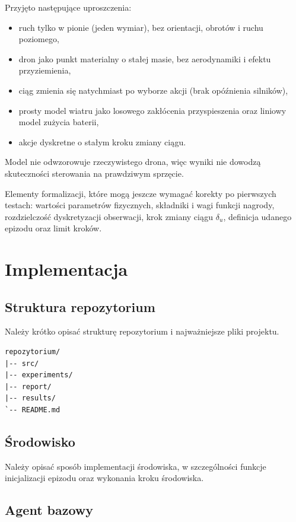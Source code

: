 \documentclass[12pt]{article}
\begin{document}
Przyjęto następujące uproszczenia:
\begin{itemize}
    \item ruch tylko w pionie (jeden wymiar), bez orientacji, obrotów i ruchu poziomego,
    \item dron jako punkt materialny o stałej masie, bez aerodynamiki i efektu przyziemienia,
    \item ciąg zmienia się natychmiast po wyborze akcji (brak opóźnienia silników),
    \item prosty model wiatru jako losowego zakłócenia przyspieszenia oraz liniowy model zużycia baterii,
    \item akcje dyskretne o stałym kroku zmiany ciągu.
\end{itemize}

Model nie odwzorowuje rzeczywistego drona, więc wyniki nie dowodzą skuteczności sterowania na prawdziwym sprzęcie.

Elementy formalizacji, które mogą jeszcze wymagać korekty po pierwszych testach: wartości parametrów fizycznych, składniki i wagi funkcji nagrody, rozdzielczość dyskretyzacji obserwacji, krok zmiany ciągu $\delta_u$, definicja udanego epizodu oraz limit kroków.

\section{Implementacja}

\subsection{Struktura repozytorium}

Należy krótko opisać strukturę repozytorium i najważniejsze pliki projektu.

\begin{verbatim}
repozytorium/
|-- src/
|-- experiments/
|-- report/
|-- results/
`-- README.md
\end{verbatim}

\subsection{Środowisko}

Należy opisać sposób implementacji środowiska, w szczególności funkcje inicjalizacji epizodu oraz wykonania kroku środowiska.

\subsection{Agent bazowy}
\end{document}
